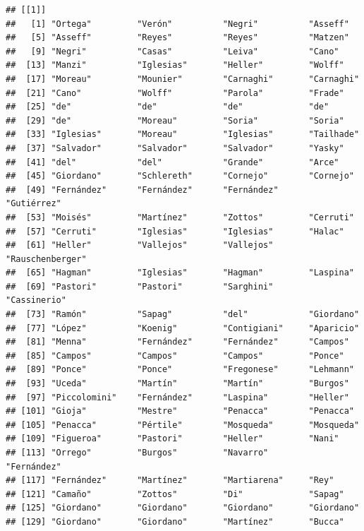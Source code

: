 \documentclass[
]{book}
\begin{document}
\begin{verbatim}
## [[1]]
##   [1] "Ortega"         "Verón"          "Negri"          "Asseff"        
##   [5] "Asseff"         "Reyes"          "Reyes"          "Matzen"        
##   [9] "Negri"          "Casas"          "Leiva"          "Cano"          
##  [13] "Manzi"          "Iglesias"       "Heller"         "Wolff"         
##  [17] "Moreau"         "Mounier"        "Carnaghi"       "Carnaghi"      
##  [21] "Cano"           "Wolff"          "Parola"         "Frade"         
##  [25] "de"             "de"             "de"             "de"            
##  [29] "de"             "Moreau"         "Soria"          "Soria"         
##  [33] "Iglesias"       "Moreau"         "Iglesias"       "Tailhade"      
##  [37] "Salvador"       "Salvador"       "Salvador"       "Yasky"         
##  [41] "del"            "del"            "Grande"         "Arce"          
##  [45] "Giordano"       "Schlereth"      "Cornejo"        "Cornejo"       
##  [49] "Fernández"      "Fernández"      "Fernández"      "Gutiérrez"     
##  [53] "Moisés"         "Martínez"       "Zottos"         "Cerruti"       
##  [57] "Cerruti"        "Iglesias"       "Iglesias"       "Halac"         
##  [61] "Heller"         "Vallejos"       "Vallejos"       "Rauschenberger"
##  [65] "Hagman"         "Iglesias"       "Hagman"         "Laspina"       
##  [69] "Pastori"        "Pastori"        "Sarghini"       "Cassinerio"    
##  [73] "Ramón"          "Sapag"          "del"            "Giordano"      
##  [77] "López"          "Koenig"         "Contigiani"     "Aparicio"      
##  [81] "Menna"          "Fernández"      "Fernández"      "Campos"        
##  [85] "Campos"         "Campos"         "Campos"         "Ponce"         
##  [89] "Ponce"          "Ponce"          "Fregonese"      "Lehmann"       
##  [93] "Uceda"          "Martín"         "Martín"         "Burgos"        
##  [97] "Piccolomini"    "Fernández"      "Laspina"        "Heller"        
## [101] "Gioja"          "Mestre"         "Penacca"        "Penacca"       
## [105] "Penacca"        "Pértile"        "Mosqueda"       "Mosqueda"      
## [109] "Figueroa"       "Pastori"        "Heller"         "Nani"          
## [113] "Orrego"         "Burgos"         "Navarro"        "Fernández"     
## [117] "Fernández"      "Martínez"       "Martiarena"     "Rey"           
## [121] "Camaño"         "Zottos"         "Di"             "Sapag"         
## [125] "Giordano"       "Giordano"       "Giordano"       "Giordano"      
## [129] "Giordano"       "Giordano"       "Martínez"       "Bucca"         

\end{verbatim}
\end{document}
